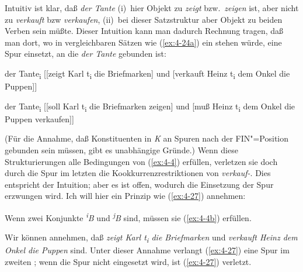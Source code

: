 \documentclass[output=paper]{langsci/langscibook}
\begin{document}
\begin{exe}
\ex
\label{ex:4-25}
\begin{xlist}

\end{xlist}
\end{exe}
Intuitiv ist klar, daß \textit{der Tante} (i)~hier Objekt zu \textit{zeigt} bzw.\ \textit{zeigen} ist, aber nicht zu \textit{verkauft} bzw \textit{verkaufen}, (ii)~bei dieser Satzstruktur aber Objekt zu beiden Verben sein müßte. Dieser Intuition kann man dadurch Rechnung tragen, daß man dort, wo in vergleichbaren Sätzen wie (\ref{ex:4-24a}) ein  stehen würde, eine Spur einsetzt, an die \textit{der Tante} gebunden ist:

\begin{exe}
\ex
\label{ex:4-26}
\begin{xlist}
\ex%
\label{ex:4-26a}
der Tante\textsubscript{i} [[zeigt Karl t\textsubscript{i} die Briefmarken] und [verkauft Heinz t\textsubscript{i} dem Onkel die Puppen]]


\ex%
\label{ex:4-26b}
der Tante\textsubscript{i} [[soll Karl t\textsubscript{i} die Briefmarken zeigen] und [muß Heinz t\textsubscript{i} dem Onkel die Puppen verkaufen]]
\end{xlist}
\end{exe}
(Für die Annahme, daß Konstituenten in \textit{K} an Spuren nach der FIN"=Position gebunden sein müssen, gibt es unabhängige Gründe.) Wenn diese Strukturierungen alle Bedingungen von (\ref{ex:4-4}) erfüllen, verletzen sie doch durch die Spur im letzten  die Kookkurrenzrestriktionen von \textit{verkauf-}. Dies entspricht der Intuition; aber es ist offen, wodurch die Einsetzung der Spur erzwungen wird. Ich will hier ein Prinzip wie (\ref{ex:4-27}) annehmen:

\begin{exe}
\ex%
\label{ex:4-27}
Wenn zwei Konjunkte \textit{\textsuperscript{i}}\textit{B} und \textit{\textsuperscript{j}}\textit{B}  sind, müssen sie (\ref{ex:4-4b}) erfüllen.
\end{exe}
Wir können annehmen, daß \textit{zeigt Karl t\textsubscript{i} die Briefmarken} und \textit{verkauft Heinz dem Onkel die Puppen}  sind. Unter dieser Annahme verlangt (\ref{ex:4-27}) eine Spur im zweiten ; wenn die Spur nicht eingesetzt wird, ist (\ref{ex:4-27}) verletzt.
\end{document}
